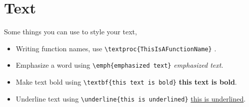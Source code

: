 \section{Text}
Some things you can use to style your text,
\begin{itemize}
    \item Writing function names, use \verb=\textproc{ThisIsAFunctionName}= .
    \item Emphasize a word using \verb=\emph{emphasized text}= \emph{emphasized text}.
    \item Make text bold using \verb=\textbf{this text is bold}= \textbf{this text is bold}.
    \item Underline text using \verb=\underline{this is underlined}= \underline{this is underlined}.
\end{itemize}